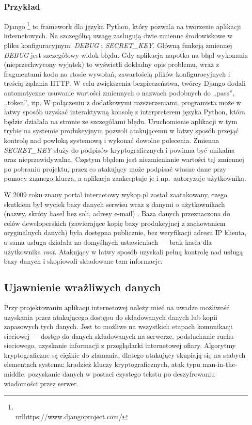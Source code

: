 \documentclass[11pt,a4paper,polish,thesis]{dcsbook}
\begin{document}
\subsubsection*{Przykład}
Django \footnote{\\url{https://www.djangoproject.com/}} to framework dla języka Python, który pozwala na tworzenie aplikacji internetowych. Na szczególną uwagę zasługują dwie zmienne środowiskowe w pliku konfiguracyjnym: \textit{DEBUG} i \textit{SECRET\_KEY}. Główną funkcją zmiennej \textit{DEBUG} jest szczegółowy widok błędu. Gdy aplikacja napotka na błąd wykonania (nieprzechwycony wyjątek) to wyświetli dokładny opis problemu, wraz z fragmentami kodu na stosie wywołań, zawartością plików konfiguracyjnych i treścią żądania HTTP. W celu zwiększenia bezpieczeństwa, twórcy Django dodali automatyczne usuwanie wartości zmiennych o nazwach podobnych do ,,pass'', ,,token'', itp. W połączeniu z dodatkowymi rozszerzeniami, programista może w łatwy sposób uzyskać interaktywną konsolę z interpreterem języka Python, która będzie działała na stronie ze szczegółami błędu. Uruchomienie aplikacji w tym trybie na systemie produkcyjnym pozwoli atakującemu w łatwy sposób przejąć kontrolę nad powłoką systemową i wykonać dowolne polecenia. Zmienna \textit{SECRET\_KEY} służy do podpisów kryptograficznych i powinna być unikalna oraz nieprzewidywalna. Częstym błędem jest niezmienianie wartości tej zmiennej po pobraniu projektu, przez co atakujący może podpisać własne dane przy pomocy znanego klucza, a aplikacja zaakceptuje je i np.~autoryzuje użytkownika.

W 2009 roku znany portal internetowy wykop.pl został zaatakowany, czego skutkiem był wyciek bazy danych serwisu wraz z danymi o użytkownikach (nazwy, skróty haseł bez soli, adresy e-mail) \cite{wykop}. Baza danych przeznaczona do celów deweloperskich (zawierające kopię bazy produkcyjnej z zachowaniem oryginalnych danych) była dostępna publicznie, bez weryfikacji adresu IP klienta, a sama usługa działała na domyślnych ustawieniach --- brak hasła dla użytkownika \textit{root}. Atakujący w łatwy sposób uzyskali pełną kontrolę nad usługą bazy danych i skopiowali składowane tam informacje.

\subsection{Ujawnienie wrażliwych danych}
Przy projektowaniu aplikacji internetowej należy mieć na uwadze możliwość uzyskania przez atakującego dostępu do składowanych danych lub kopii zapasowych tych danych. Jest to możliwe na wszystkich etapach komunikacji sieciowej --- dostęp do danych składowanych na serwerze, podsłuchanie ruchu sieciowego, uzyskanie informacji z przeglądarki internetowej ofiary. Algorytmy kryptograficzne są ciężkie do złamania, dlatego atakujący skupiają się na słabych elementach systemu: kradzież kluczy kryptograficznych, atak typu man-in-the-middle, pozyskanie danych w postaci czystego tekstu po deszyfrowaniu wiadomości przez serwer.
\end{document}
